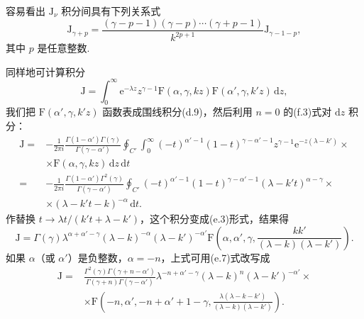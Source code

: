 容易看出 $\mathrm{J}_{\nu}$ 积分间具有下列关系式
\begin{equation}
  \mathrm{J}_{\gamma+p}=\frac{(\gamma-p-1)(\gamma-p)\cdots(\gamma+p-1)}{k^{2p+1}}
  \mathrm{J}_{\gamma-1-p},
\end{equation}
其中 $p$ 是任意整数.

同样地可计算积分
\begin{equation}
  \mathrm{J}=\int_0^{\infty}\mathrm{e}^{-\lambda z}z^{\gamma-1}
  \mathrm{F}(\alpha,\gamma,kz)\mathrm{F}(\alpha',\gamma,k'z)\,\mathrm{d}z,
\end{equation}
我们把 $\mathrm{F}(\alpha',\gamma,k'z)$ 函数表成围线积分(d.9)，然后利用 $n=0$ 的(f.3)式对 $\mathrm{d}z$ 积分：
\begin{equation*}
\begin{aligned}
  \mathrm{J}={}&-\frac{1}{2\pi i}\frac{\Gamma(1-\alpha')\Gamma(\gamma)}
  {\Gamma(\gamma-\alpha')}
  \oint_{C'}\int_0^{\infty}(-t)^{\alpha'-1}(1-t)^{\gamma-\alpha'-1}z^{\gamma-1}
  \mathrm{e}^{-z(\lambda-k')}\times\\
  &\times\mathrm{F}(\alpha,\gamma,kz)\,\mathrm{d}z\,\mathrm{d}t\\
  ={}&-\frac{1}{2\pi i}\frac{\Gamma(1-\alpha')\Gamma^2(\gamma)}
  {\Gamma(\gamma-\alpha')}
  \oint_{C'}(-t)^{\alpha'-1}(1-t)^{\gamma-\alpha'-1}
  (\lambda-k't)^{\alpha-\gamma}\times\\
  &\times(\lambda-k't-k)^{-\alpha}\,\mathrm{d}t.
\end{aligned}
\end{equation*}
作替换 $t\to\lambda t/(k't+\lambda-k')$，这个积分变成(e.3)形式，结果得
\begin{equation}
  \mathrm{J}=\Gamma(\gamma)\lambda^{\alpha+\alpha'-\gamma}(\lambda-k)^{-\alpha}
  (\lambda-k')^{-\alpha'}
  \mathrm{F}\left(\alpha,\alpha',\gamma,
  \frac{kk'}{(\lambda-k)(\lambda-k')}\right).
\end{equation}
如果 $\alpha$（或 $\alpha'$）是负整数，$\alpha=-n$，上式可用(e.7)式改写成
\begin{equation}
\begin{aligned}
  \mathrm{J}={}&\frac{\Gamma^2(\gamma)\Gamma(\gamma+n-\alpha')}
  {\Gamma(\gamma+n)\Gamma(\gamma-\alpha')}
  \lambda^{-n+\alpha'-\gamma}(\lambda-k)^n(\lambda-k')^{-\alpha'}\times\\
  &\times\mathrm{F}\left(-n,\alpha',-n+\alpha'+1-\gamma,
  \frac{\lambda(\lambda-k-k')}{(\lambda-k)(\lambda-k')}\right).
\end{aligned}
\end{equation}

